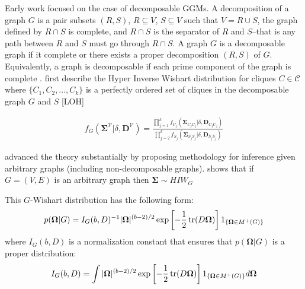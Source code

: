 \begin{DoubleSpace*}
Early work \cite{dawid1993} focused on the case of decomposable GGMs. A decomposition of a graph $G$ is a pair subsets $(R,S)$, $R\subseteq V$, $S\subseteq V$ such that $V=R \cup S$, the graph defined by $R \cap S$ is complete, and $R \cap S$ is the separator of $R$ and $S$--that is any path between $R$ and $S$ must go through $R \cap S$. A graph $G$ is a decomposable graph if it complete or there exists a proper decomposition $(R,S)$ of $G$. Equivalently, a graph is decomposable if each prime component of the graph is complete \cite{roverato2002}. \cite{dawid1993} first describe the Hyper Inverse Wishart distribution for cliques $C\in \mathcal{C}$ where $\{C_1,C_2, \hdots,C_k \}$ is a perfectly ordered set of cliques in the decomposable graph $G$ and $S$ [LOH]

\begin{align}
f_G(\boldsymbol{\Sigma}^{\mathcal{V}}|\delta,\textbf{D}^{\mathcal{V}})= \frac{\prod_{j=1}^k f_{C_j}(\boldsymbol{\Sigma}_{C_j C_j}|\delta,\textbf{D}_{C_j C_j})}{\prod_{j=2}^k f_{S_j}(\boldsymbol{\Sigma}_{S_j S_j}|\delta,\textbf{D}_{S_j S_j})}
\end{align}

\cite{roverato2002} advanced the theory substantially by proposing methodology for inference given arbitrary graphs (including non-decomposable graphs). \cite{roverato2002} shows that if $G=(V,E)$ is an arbitrary graph then $\boldsymbol{\Sigma} \sim HIW_G$

This $G$-Wishart distribution has the following form: 
\begin{align}
p(\boldsymbol{\Omega}|G)=I_G(b,D)^{-1}|\boldsymbol{\Omega}|^{(b-2)/2} \exp \left[-\frac{1}{2} \operatorname{tr}(D \boldsymbol{\Omega}) \right] 1_{ \{\boldsymbol{\Omega} \in M^+(G)\} }
\end{align}
where $I_G(b,D)$ is a normalization constant that ensures that $p(\boldsymbol{\Omega}|G)$ is a proper distribution:
\begin{align}
I_G(b,D)=\int |\boldsymbol{\Omega}|^{(b-2)/2} \exp \left[-\frac{1}{2} \operatorname{tr}(D \boldsymbol{\Omega}) \right] 1_{ \{\boldsymbol{\Omega} \in M^+(G)\} } d\boldsymbol{\Omega}
\end{align}

\end{DoubleSpace*}